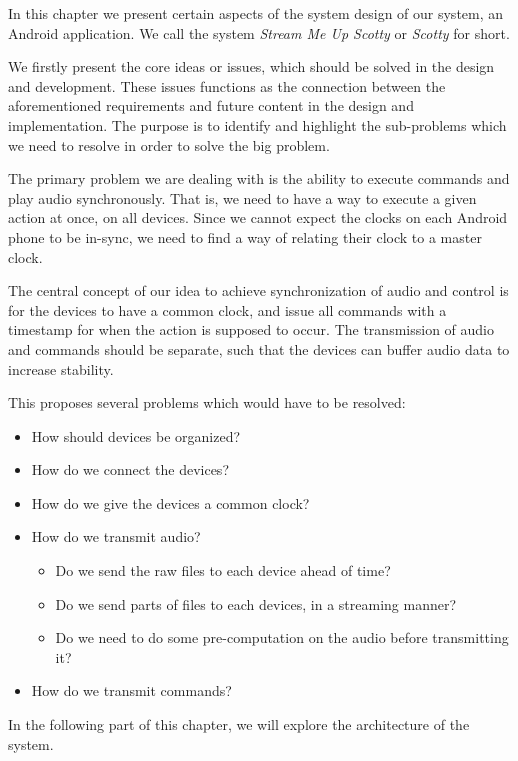 In this chapter we present certain aspects of the system design of our system, an Android application.
We call the system \textit{Stream Me Up Scotty} or \textit{Scotty} for short.

We firstly present the core ideas or issues, which should be solved in the design and development.
These issues functions as the connection between the aforementioned requirements and future content in the design and implementation.
The purpose is to identify and highlight the sub-problems which we need to resolve in order to solve the big problem.

The primary problem we are dealing with is the ability to execute commands and play audio synchronously.
That is, we need to have a way to execute a given action at once, on all devices.
Since we cannot expect the clocks on each Android phone to be in-sync, we need to find a way of relating their clock to a master clock.

The central concept of our idea to achieve synchronization of audio and control is for the devices to have a common clock, and issue all commands with a timestamp for when the action is supposed to occur.
The transmission of audio and commands should be separate, such that the devices can buffer audio data to increase stability.

This proposes several problems which would have to be resolved:
\begin{itemize}
    \item How should devices be organized?
    \item How do we connect the devices?
    \item How do we give the devices a common clock?
    \item How do we transmit audio?
    \begin{itemize}
        \item Do we send the raw files to each device ahead of time?
        \item Do we send parts of files to each devices, in a streaming manner?
        \item Do we need to do some pre-computation on the audio before transmitting it?
    \end{itemize}
    \item How do we transmit commands?
\end{itemize}

\bigskip\noindent
In the following part of this chapter, we will explore the architecture of the system.

